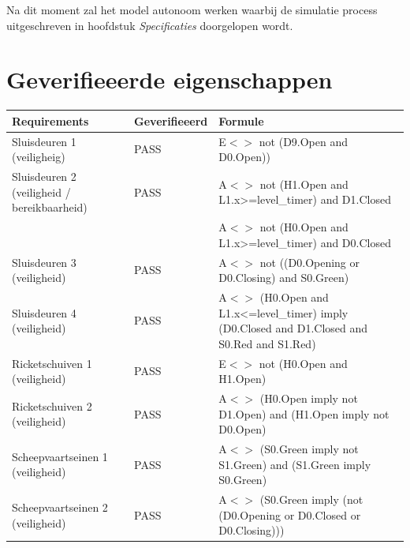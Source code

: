 \documentclass{article}
\begin{document}
\noindent Na dit moment zal het model autonoom werken waarbij de simulatie process uitgeschreven
in hoofdstuk \textit{Specificaties} doorgelopen wordt.


\newpage
\section {Geverifieeerde eigenschappen}
    \centering
    \begin{tabular}{ |p{4cm}||p{2cm}|p{7cm}|}
        \hline
            Requirements & Geverifieeerd & Formule \\
        \hline
        \hline
            Sluisdeuren 1 (veiligheig)                      &           \leavevmode\color[HTML]{32CD32} PASS          &         E$<>$ not (D9.Open and D0.Open))        \\ \hline
            Sluisdeuren 2 (veiligheid / bereikbaarheid)     &           \leavevmode\color[HTML]{32CD32} PASS          &         A$<>$ not (H1.Open and L1.x>=level\_timer) and D1.Closed \\ 
            &&A$<>$ not (H0.Open and L1.x>=level\_timer) and D0.Closed       \\ \hline
            Sluisdeuren 3 (veiligheid)                      &           \leavevmode\color[HTML]{32CD32} PASS          &         A$<>$ not ((D0.Opening or D0.Closing) and S0.Green)        \\ \hline
            Sluisdeuren 4 (veiligheid)                      &           \leavevmode\color[HTML]{32CD32} PASS          &         A$<>$ (H0.Open and L1.x<=level\_timer) imply (D0.Closed and D1.Closed and S0.Red and S1.Red)        \\ \hline
            Ricketschuiven 1 (veiligheid)                   &           \leavevmode\color[HTML]{32CD32} PASS          &         E$<>$ not (H0.Open and H1.Open)        \\ \hline
            Ricketschuiven 2 (veiligheid)                   &           \leavevmode\color[HTML]{32CD32} PASS          &         A$<>$ (H0.Open imply not D1.Open) and (H1.Open imply not D0.Open)        \\ \hline
            Scheepvaartseinen 1 (veiligheid)                &           \leavevmode\color[HTML]{32CD32} PASS          &         A$<>$ (S0.Green imply not S1.Green) and (S1.Green imply S0.Green)        \\ \hline
            Scheepvaartseinen 2 (veiligheid)                &           \leavevmode\color[HTML]{32CD32} PASS          &         A$<>$ (S0.Green imply (not (D0.Opening or D0.Closed or D0.Closing)))        \\ \hline

\end{tabular}
\end{document}

